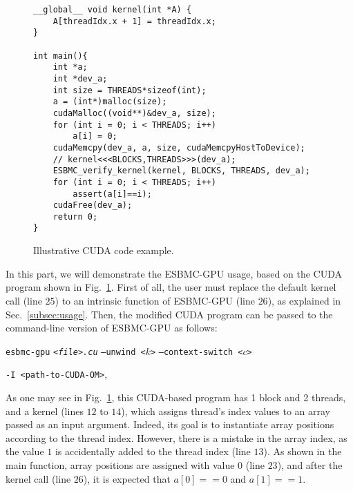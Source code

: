 \documentclass{llncs}
\begin{document}
\begin{enumerate}
\begin{figure} [htb]
\begin{minipage}{\textwidth}
\begin{lstlisting}
__global__ void kernel(int *A) {
	A[threadIdx.x + 1] = threadIdx.x;
}

int main(){
	int *a;
	int *dev_a;
	int size = THREADS*sizeof(int);
	a = (int*)malloc(size);
	cudaMalloc((void**)&dev_a, size);
	for (int i = 0; i < THREADS; i++)
		a[i] = 0;
	cudaMemcpy(dev_a, a, size, cudaMemcpyHostToDevice);
	// kernel<<<BLOCKS,THREADS>>>(dev_a);
	ESBMC_verify_kernel(kernel, BLOCKS, THREADS, dev_a);
	for (int i = 0; i < THREADS; i++)
		assert(a[i]==i);	
	cudaFree(dev_a);
	return 0;
}
\end{lstlisting}
\end{minipage}
\caption{Illustrative CUDA code example.}
\label{fig:illustrative-example}
\end{figure}

In this part, we will demonstrate the ESBMC-GPU usage, based on the CUDA program shown in Fig.~\ref{fig:illustrative-example}. First of all, the user must replace the default kernel call (line $25$) to an intrinsic function of ESBMC-GPU (line $26$), as explained in Sec.~\ref{subsec:usage}. Then, the modified CUDA program can be passed to the command-line version of ESBMC-GPU as follows:

\begin{center}
\noindent \texttt{esbmc-gpu} \emph{\tt <file>.cu} {\tt --unwind <$k$>}  {\tt --context-switch <$c$>}

 {\tt -I <path-to-CUDA-OM>},
\end{center}


As one may see in Fig.~\ref{fig:illustrative-example}, this CUDA-based program has 1 block and 2 threads, and a kernel (lines $12$ to $14$), which assigns thread's index values to an array passed as an input argument. Indeed, its goal is to instantiate array positions according to the thread index. However, there is a mistake in the array index, as the value $1$ is accidentally added to the thread index (line $13$). As shown in the main function, array positions are assigned with value $0$ (line $23$), and after the kernel call (line $26$), it is expected that $a[0] == 0$ and $a[1] == 1$.


\end{enumerate}
\end{document}
